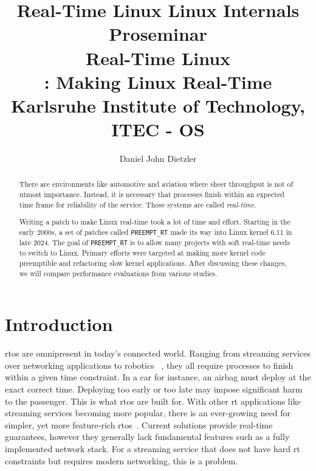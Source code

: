 \documentclass[10pt,twocolumn,a4paper]{article}
\begin{document}


\title{Real-Time Linux}

\title{%
{\normalfont \normalsize Linux Internals Proseminar}\\%
Real-Time Linux \\%
{\normalfont \normalsize {}: Making Linux Real-Time}\\%
{\normalfont \small
Karlsruhe Institute of Technology, ITEC - OS
}%
}

\author{Daniel John Dietzler}

\newcommand{\code}[1]{{\tt \small{#1}}}

\maketitle

\begin{abstract}
  There are environments like automotive and aviation where sheer throughput is not of utmost importance.
  Instead, it is necessary that processes finish within an expected time frame for reliability of the service.
  Those systems are called \emph{real-time}.

  Writing a patch to make Linux real-time took a lot of time and effort.
  Starting in the early 2000s, a set of patches called \code{PREEMPT\_RT} made its way into Linux kernel 6.11 in late 2024.
  The goal of \code{PREEMPT\_RT} is to allow many projects with soft real-time needs to switch to Linux.
  Primary efforts were targeted at making more kernel code preemptible and refactoring slow kernel applications.
  After discussing these changes, we will compare performance evaluations from various studies.
\end{abstract}

\section{Introduction}\label{sec:introduction}

\acrfull{rtos} are omnipresent in today's connected world.
Ranging from streaming services over networking applications to robotics ~\cite{buttazzo_hard_1997}, they all require processes to finish within a given time constraint.
In a car for instance, an airbag must deploy at the exact correct time.
Deploying too early or too late may impose significant harm to the passenger.
This is what \acrshort{rtos} are built for.
With other \acrshort{rt} applications like streaming services becoming more popular, there is an ever-growing need for simpler, yet more feature-rich \acrshort{rtos}~\cite{reghenzani_realtime_2019}.
Current solutions provide real-time guarantees, however they generally lack fundamental features such as a fully implemented network stack.
For a streaming service that does not have hard \acrshort{rt} constraints but requires modern networking, this is a problem.
\end{document}
